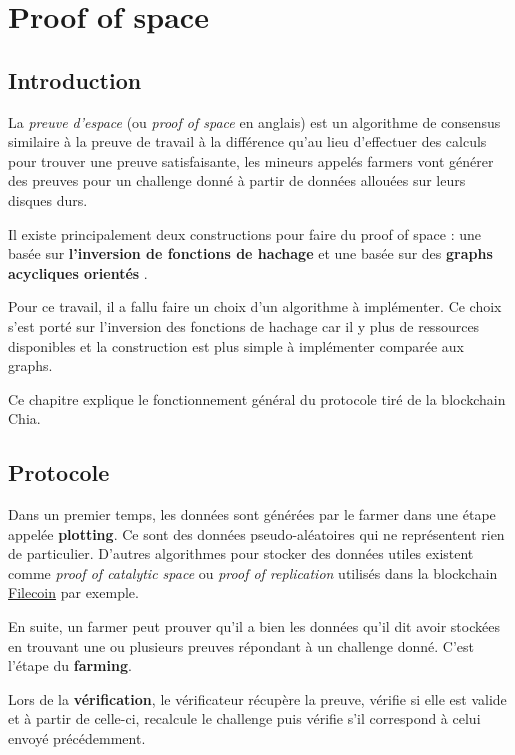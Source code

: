 \chapter{Proof of space}
\label{ch:pospace}

\section{Introduction}

La \emph{preuve d'espace} (ou \emph{proof of space} en anglais) est un algorithme de consensus similaire à la preuve de travail à la différence qu'au lieu d'effectuer des calculs pour trouver une preuve satisfaisante, les mineurs appelés farmers vont générer des preuves pour un challenge donné à partir de données allouées sur leurs disques durs. 

Il existe principalement deux constructions pour faire du proof of space : une basée sur \textbf{l'inversion de fonctions de hachage} \cite{DBLP:conf/asiacrypt/AbusalahACKPR17} et une basée sur des \textbf{graphs acycliques orientés} \cite{DBLP:conf/crypto/DziembowskiFKP15}.

Pour ce travail, il a fallu faire un choix d'un algorithme à implémenter. Ce choix s'est porté sur l'inversion des fonctions de hachage car il y plus de ressources disponibles et la construction est plus simple à implémenter comparée aux graphs.

Ce chapitre explique le fonctionnement général du protocole tiré de la blockchain Chia.

\section{Protocole}

Dans un premier temps, les données sont générées par le farmer dans une étape appelée \textbf{plotting}. Ce sont des données pseudo-aléatoires qui ne représentent rien de particulier. D'autres algorithmes pour stocker des données utiles existent comme \emph{proof of catalytic space} ou \emph{proof of replication} utilisés dans la blockchain \href{https://filecoin.io/}{Filecoin} par exemple.

En suite, un farmer peut prouver qu'il a bien les données qu'il dit avoir stockées en trouvant une ou plusieurs preuves répondant à un challenge donné. C'est l'étape du \textbf{farming}.

Lors de la \textbf{vérification}, le vérificateur récupère la preuve, vérifie si elle est valide et à partir de celle-ci, recalcule le challenge puis vérifie s'il correspond à celui envoyé précédemment.

